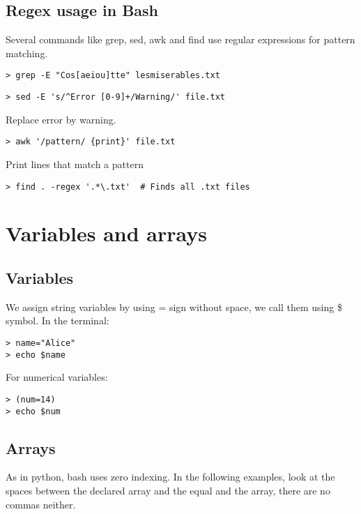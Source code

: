 \documentclass[24pt]{article}
\begin{document}
 


\subsection{Regex usage in Bash}

Several commands like grep, sed, awk and find use regular expressions for pattern matching. 

\begin{lstlisting}
> grep -E "Cos[aeiou]tte" lesmiserables.txt
\end{lstlisting}

\begin{lstlisting}
> sed -E 's/^Error [0-9]+/Warning/' file.txt
\end{lstlisting}

Replace error by warning.

\begin{lstlisting}
> awk '/pattern/ {print}' file.txt
\end{lstlisting}

Print lines that match a pattern

\begin{lstlisting}
> find . -regex '.*\.txt'  # Finds all .txt files
\end{lstlisting}


\section{Variables and arrays}

\subsection{Variables}
We assign string variables by using = sign without space, we call them using \$ symbol. In the terminal:
\begin{lstlisting}
> name="Alice"
> echo $name
\end{lstlisting}

For numerical variables:
\begin{lstlisting}
> (num=14)
> echo $num
\end{lstlisting}

\subsection{Arrays}
As in python, bash uses zero indexing. In the following examples, look at the spaces between the declared array and the equal and the array, there are no commas neither. 
\end{document}
